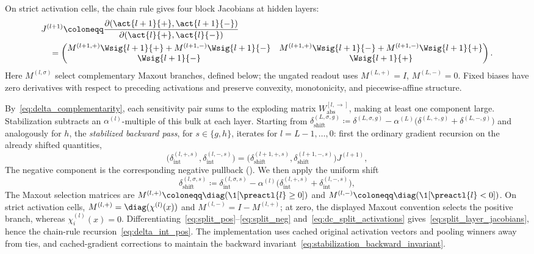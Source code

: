 On strict activation cells, the chain rule gives four block Jacobians at hidden layers:
\begin{equation}
\begin{aligned}
&J^{(l+1)}\coloneqq\frac{\partial(\act{l+1}{+},\act{l+1}{-})}{\partial(\act{l}{+},\act{l}{-})}\\
&\quad=\begin{pmatrix}
M^{(l+1,+)}\Wsig{l+1}{+}+M^{(l+1,-)}\Wsig{l+1}{-}
& M^{(l+1,+)}\Wsig{l+1}{-}+M^{(l+1,-)}\Wsig{l+1}{+}\\
\Wsig{l+1}{-} & \Wsig{l+1}{+}
\end{pmatrix}.
\end{aligned}
\label{eq:split_layer_jacobians}
\end{equation}
Here $M^{(l,\sigma)}$ select complementary Maxout branches, defined below; the ungated readout uses $M^{(L,+)}=I$, $M^{(L,-)}=0$. Fixed biases have zero derivatives with respect to preceding activations and preserve convexity, monotonicity, and piecewise-affine structure.

By~\eqref{eq:delta_complementarity}, each sensitivity pair sums to the exploding matrix $W_{\mathrm{abs}}^{[l, \rightarrow]}$, making at least one component large. Stabilization subtracts an $\alpha^{(l)}$-multiple of this bulk at each layer. Starting from $\delta_{\mathrm{shift}}^{(L,\sigma,g)} \coloneqq \delta^{(L,\sigma,g)} - \alpha^{(L)} \bigl( \delta^{(L,+,g)} + \delta^{(L,-,g)} \bigr)$ and analogously for $h$, the \emph{stabilized backward pass}, for $s\in\{g,h\}$, iterates for $l = L-1, \dots, 0$: first the ordinary gradient recursion on the already shifted quantities,
\begin{equation}
\bigl(\delta_{\mathrm{int}}^{(l,+,s)},\delta_{\mathrm{int}}^{(l,-,s)}\bigr)
=\bigl(\delta_{\mathrm{shift}}^{(l+1,+,s)},\delta_{\mathrm{shift}}^{(l+1,-,s)}\bigr)J^{(l+1)},
\label{eq:delta_int_pos}
\end{equation}
The negative component is the corresponding negative pullback (). We then apply the uniform shift
\begin{equation}
	\delta_{\mathrm{shift}}^{(l,\sigma,s)} \coloneqq \delta_{\mathrm{int}}^{(l,\sigma,s)} - \alpha^{(l)} \bigl( \delta_{\mathrm{int}}^{(l,+,s)} + \delta_{\mathrm{int}}^{(l,-,s)} \bigr),
	\label{eq:delta_shift_def}
\end{equation}
The Maxout selection matrices are $M^{(l,+)}\coloneqq\diag(\1[\preactl{l}\ge0])$ and $M^{(l,-)}\coloneqq\diag(\1[\preactl{l}<0])$. On strict activation cells, $M^{(l,+)}=\diag(\chi^{(l)}(x))$ and $M^{(l,-)}=I-M^{(l,+)}$; at zero, the displayed Maxout convention selects the positive branch, whereas $\chi^{(l)}_i(x)=0$. Differentiating~\eqref{eq:split_pos}--\eqref{eq:split_neg} and~\eqref{eq:dc_split_activations} gives~\eqref{eq:split_layer_jacobians}, hence the chain-rule recursion~\eqref{eq:delta_int_pos}. The implementation uses cached original activation vectors and pooling winners away from ties, and cached-gradient corrections to maintain the backward invariant~\eqref{eq:stabilization_backward_invariant}.

